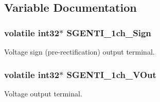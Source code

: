 \subsection{Variable Documentation}
\hypertarget{a00033_a5369a96cf47ea2fbd84a92ed4091b48b}{
\subsubsection[{S\-G\-E\-N\-T\-I\-\_\-1ch\-\_\-\-Sign}]{\setlength{\rightskip}{0pt plus 5cm}volatile int32$\ast$ S\-G\-E\-N\-T\-I\-\_\-1ch\-\_\-\-Sign}}\label{a00033_a5369a96cf47ea2fbd84a92ed4091b48b}
Voltage sign (pre-\/rectification) output terminal. \hypertarget{a00033_a5dba1fe543c9e62ef6cc8cf4179de951}{
\subsubsection[{S\-G\-E\-N\-T\-I\-\_\-1ch\-\_\-\-V\-Out}]{\setlength{\rightskip}{0pt plus 5cm}volatile int32$\ast$ S\-G\-E\-N\-T\-I\-\_\-1ch\-\_\-\-V\-Out}}\label{a00033_a5dba1fe543c9e62ef6cc8cf4179de951}
Voltage output terminal. 